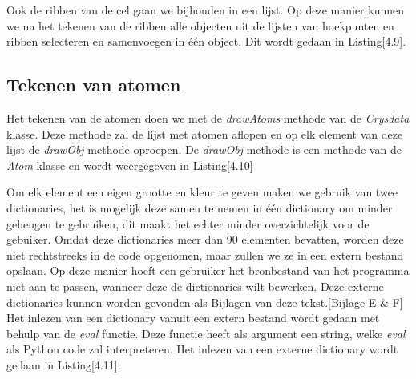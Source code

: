 Ook de ribben van de cel gaan we bijhouden in een lijst. Op deze manier kunnen we na het tekenen van de ribben alle objecten uit de lijsten van hoekpunten en ribben selecteren en samenvoegen in één object. Dit wordt gedaan in Listing[4.9].     

\subsection{Tekenen van atomen}

Het tekenen van de atomen doen we met de \textit{drawAtoms} methode van de \textit{Crysdata} klasse. Deze methode zal de lijst met atomen aflopen en op elk element van deze lijst de \textit{drawObj} methode oproepen. De \textit{drawObj} methode is een methode van de \textit{Atom} klasse en wordt weergegeven in Listing[4.10] 



Om elk element een eigen grootte en kleur te geven maken we gebruik van twee dictionaries, het is mogelijk deze samen te nemen in één dictionary om minder geheugen te gebruiken, dit maakt het echter minder overzichtelijk voor de gebuiker. Omdat deze dictionaries meer dan 90 elementen bevatten, worden deze niet rechtstreeks in de code opgenomen, maar zullen we ze in een extern bestand opslaan. Op deze manier hoeft een gebruiker het bronbestand van het programma niet aan te passen, wanneer deze de dictionaries wilt bewerken. Deze externe dictionaries kunnen worden gevonden als Bijlagen van deze tekst.[Bijlage E \& F] Het inlezen van een dictionary vanuit een extern bestand wordt gedaan met behulp van de \textit{eval} functie. Deze functie heeft als argument een string, welke \textit{eval} als Python code zal interpreteren. Het inlezen van een externe dictionary wordt gedaan in Listing[4.11]. 
  


